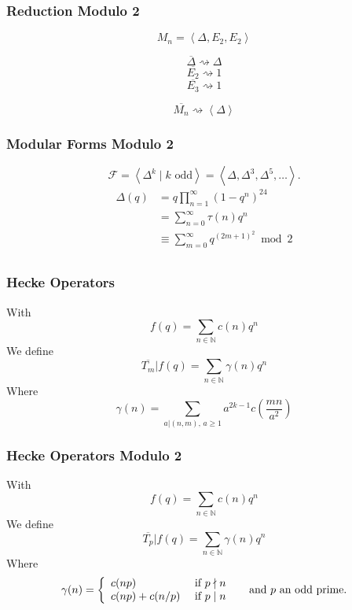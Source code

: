 \documentclass[12pt]{beamer}
\begin{document}
	\begin{frame}
		\frametitle{Reduction Modulo 2}
		$$M_n = \left\langle \Delta, E_2, E_2 \right\rangle$$
		
		$$\overline{\Delta} \rightsquigarrow \Delta$$
		$$\overline{E_2} \rightsquigarrow 1$$
		$$\overline{E_3} \rightsquigarrow 1$$
		
		$$\overline{M_n} \rightsquigarrow \left\langle \Delta \right\rangle$$
	\end{frame}

	\begin{frame}
		\frametitle{Modular Forms Modulo 2}
		$$
		\mathcal{F}
		= \left\langle \Delta^k \mid k \text{ odd} \right\rangle
		= \left\langle \Delta, \Delta^3, \Delta^5, \dots \right\rangle.
		$$
		\begin{align*}
			\Delta(q)
			&= q \prod_{n=1}^{\infty} (1-q^n)^{24}\\
			&= \sum_{n=0}^{\infty} \tau(n)q^n\\
			&\equiv \sum_{m=0}^{\infty} q^{(2m+1)^2} \bmod 2\\
		\end{align*}
	\end{frame}
	
	
	\begin{frame}
		\frametitle{Hecke Operators}
		With
		$$
		f(q) = \sum_{n \in \mathbb{N}} c(n)q^n
		$$
		We define
		$$
		\overline{T_m}|f(q) = \sum_{n \in \mathbb{N}} \gamma(n)q^n
		$$
		Where
		$$
		\gamma(n) = \sum_{a | (n,m),\, a \geq 1} a^{2k-1} c\left( \frac{mn}{a^2} \right)
		$$
	\end{frame}
	\begin{frame}
		\frametitle{Hecke Operators Modulo 2}
		With
		$$
		f(q) = \sum_{n \in \mathbb{N}} c(n)q^n
		$$
		We define
		$$
		\overline{T_p}|f(q) = \sum_{n \in \mathbb{N}} \gamma(n)q^n
		$$
		Where
		$$
		\gamma(n) = 
		\left\lbrace
		\begin{array}{l l}
		c(np)        & \text{ if } p \nmid n \\
		c(np)+c(n/p) & \text{ if } p \mid  n
		\end{array}
		\right. 
		\quad \text{ and } p \text{ an odd prime}.
		$$
	\end{frame}
\end{document}
